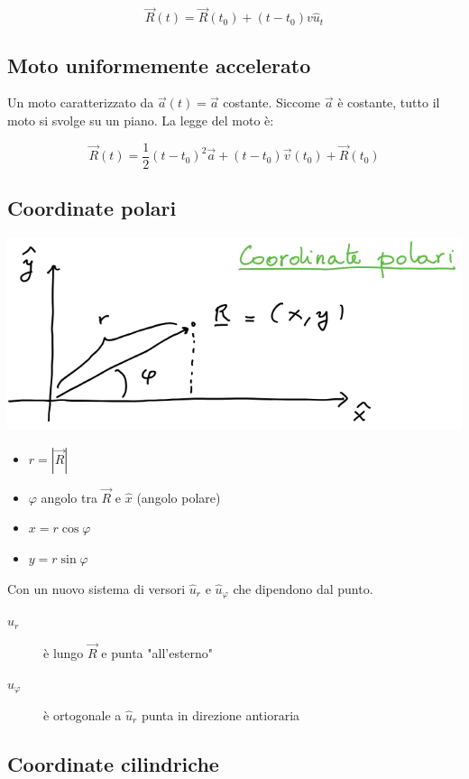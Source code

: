\documentclass{article}
\begin{document}
$$
\vec{R}(t) = \vec{R}(t_0) + (t-t_0)v\hat{u}_t
$$

\subsection{Moto uniformemente accelerato}

Un moto caratterizzato da $\vec{a}(t) = \vec{a}$ costante.
Siccome $\vec{a}$ è costante, tutto il moto si svolge su un piano.
La legge del moto è:

$$
\vec{R}(t) = \frac{1}{2}(t-t_0)^2 \vec{a} + (t-t_0) \vec{v}(t_0) + \vec{R}(t_0)
$$

\subsection{Coordinate polari}

\includegraphics[width=\columnwidth]{esempio-coordinate-polari}

\begin{itemize}
    \item $r = |\vec{R}|$
    \item $\varphi$ angolo tra $\vec{R}$ e $\hat{x}$ (angolo polare)
    \item $x = r \cos{\varphi}$
    \item $y = r \sin{\varphi}$
\end{itemize}

\noindent
Con un nuovo sistema di versori $\hat{u}_r$ e $\hat{u}_\varphi$ che dipendono dal punto.

\begin{description}
    \item[$\hat{u}_r$] è lungo $\vec{R}$ e punta "all'esterno"
    \item[$\hat{u}_\varphi$] è ortogonale a $\hat{u}_r$ punta in direzione antioraria
\end{description}

\subsection{Coordinate cilindriche}
\end{document}
